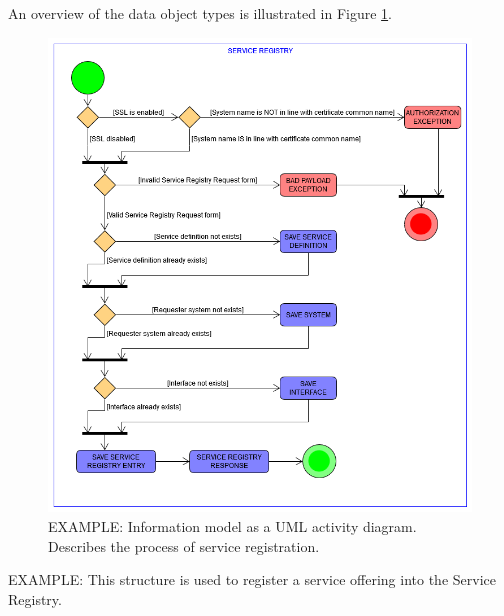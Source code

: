 \documentclass[a4paper]{arrowhead}
\begin{document}
An overview of the data object types is illustrated in Figure \ref{fig:model_overview}.

\begin{figure}[ht!]
  \centering
  \includegraphics[width=\textwidth]{figures/post_service_registry_register_activity_uml}
  \caption{\color{red} EXAMPLE:
    Information model as a UML activity diagram.
    Describes the process of service registration.
    \color{black}
  }
  \label{fig:model_overview}
\end{figure}


\color{red} 
 EXAMPLE: This structure is used to register a service offering into the Service Registry.
\color{black}
 
\end{document}
